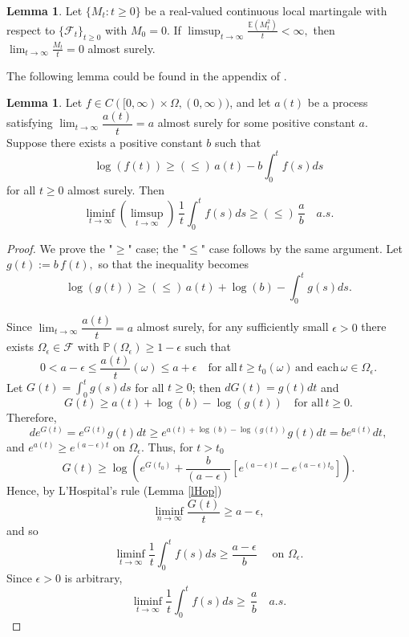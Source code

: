 \documentclass[12pt,a4paper,reqno]{amsart}
\theoremstyle{definition}
\newtheorem{lemma}[theorem]{Lemma}
\theoremstyle{remark}
\theoremstyle{plain}
\begin{document}
\begin{lemma}\label{Ap2}
Let $\{M_t:t\geq 0\}$ be a real-valued continuous local martingale with respect to $\{\mathcal{F}_t\}_{t\geq 0}$ with $M_0=0$. If $\limsup_{t \to \infty} \frac{\mathbb{E}(M_t^2)}{t}   < \infty,$ then $\lim_{t \to \infty} \frac{M_t}{t}=0$ almost surely.
\end{lemma}

The following lemma could be found in the appendix of \cite{balogh2025stochastic}. 
\begin{lemma}\label{Ap1}
Let $f\in C([0,\infty)\times \Omega,(0,\infty))$, and let $a(t)$ be a process satisfying $\lim_{t \to \infty} \dfrac{a(t)}{t}=a$ almost surely for some positive constant $a$.  Suppose there exists a positive constant $b$ such that
$$\log(f(t))\geq (\leq) \, a(t)-b\int_0^t f(s)ds $$
for all $t\geq 0$ almost surely. Then
$$\liminf_{t\to \infty} (\limsup_{t\to \infty})\, \frac{1}{t} \int_0^t f(s)ds\geq (\leq) \, \dfrac{a}{b} \quad a.s.$$
\end{lemma}

\begin{proof} We prove the "$\geq$" case; the "$\leq$" case follows by the same argument. Let $g(t):=b\,f(t),$ so that the inequality becomes
$$
\log(g(t))\geq (\leq) \, a(t)+\log(b)-\int_0^t g(s)ds. 
$$

Since $\lim_{t \to \infty} \dfrac{a(t)}{t}=a$ almost surely, for any sufficiently small $\epsilon>0$ there exists $\Omega_\epsilon\in \mathcal{F}$ with $\mathbb{P}(\Omega_\epsilon)\geq 1-\epsilon$ such that
$$
0<a-\epsilon \leq \dfrac{a(t)}{t}(\omega)\leq a+\epsilon \quad \text{for all} \,t\geq t_0(\omega) \, \text{and each} \, \omega \in \Omega_\epsilon.
$$
Let $G(t)=\int_0^t g(s) ds$ for all $t\geq 0$; then $dG(t)=g(t)dt$ and 
$$
G(t)\geq a(t)+\log(b) -\log(g(t)) \quad \text{for all} \,t\geq 0. 
$$
Therefore, 
$$
de^{G(t)}=e^{G(t)}g(t)dt\geq e^{a(t)+\log(b) -\log(g(t))} g(t)dt=b e^{a(t)} dt,
$$
and $e^{a(t)}\geq e^{(a-\epsilon)t}$ on $\Omega_\epsilon$. Thus, for $t>t_0$
$$
G(t)\geq \log\left(e^{G(t_0)}+\frac{b}{(a-\epsilon)}[e^{(a-\epsilon)t}-e^{(a-\epsilon)t_0}]\right).
$$ 
Hence, by L'Hospital's rule (Lemma \ref{lHop})
$$
\liminf_{n\to \infty} \dfrac{G(t)}{t}\geq a-\epsilon,
$$
and so
$$
\liminf_{t\to \infty} \frac{1}{t} \int_0^t f(s)ds\geq \dfrac{a-\epsilon}{b} \quad \text{ on }\Omega_\epsilon.
$$
Since $\epsilon>0$ is arbitrary, 
$$
\liminf_{t\to \infty}  \frac{1}{t} \int_0^t f(s)ds\geq  \, \dfrac{a}{b} \quad a.s.
$$
\end{proof}



\newpage


\end{document}
